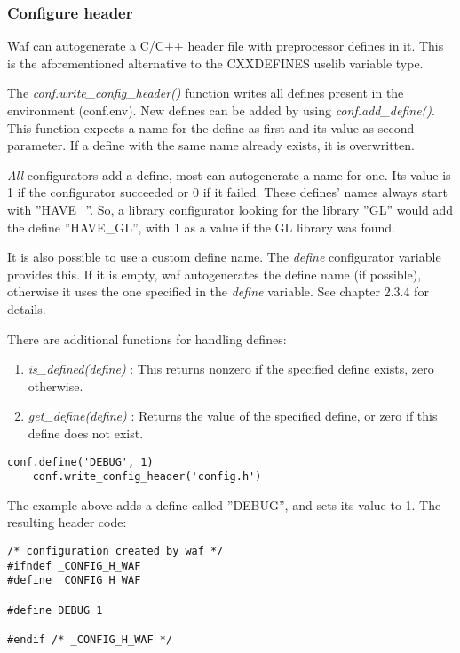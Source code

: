 \documentclass[a4paper,10pt]{article}
\begin{document}
\subsubsection{Configure header}
Waf can autogenerate a C/C++ header file with preprocessor defines in it. This is the aforementioned alternative to the CXXDEFINES uselib variable type.

The \emph{conf.write\_config\_header()} function writes all defines present in the environment (conf.env). New defines can be added by using \emph{conf.add\_define()}. This function expects a name for the define as first and its value as second parameter. If a define with the same name already exists, it is overwritten.

\emph{All} configurators add a define, most can autogenerate a name for one. Its value is 1 if the configurator succeeded or 0 if it failed. These defines' names always start with ''HAVE\_''. So, a library configurator looking for the library ''GL'' would add the define ''HAVE\_GL'', with 1 as a value if the GL library was found.

It is also possible to use a custom define name. The \emph{define} configurator variable provides this. If it is empty, waf autogenerates the define name (if possible), otherwise it uses the one specified in the \emph{define} variable. See chapter 2.3.4 for details.

There are additional functions for handling defines:

\begin{enumerate}
	\item \emph{is\_defined(define)} : This returns nonzero if the specified define exists, zero otherwise.
	\item \emph{get\_define(define)} : Returns the value of the specified define, or zero if this define does not exist.
\end{enumerate}

\begin{center}
	\begin{lstlisting}[caption=\footnotesize Configure header example]
    conf.define('DEBUG', 1)
    conf.write_config_header('config.h')
	\end{lstlisting}
\end{center}

The example above adds a define called ''DEBUG'', and sets its value to 1. The resulting header code:

\begin{center}
	\begin{lstlisting}[caption=\footnotesize Configure header example]
/* configuration created by waf */
#ifndef _CONFIG_H_WAF
#define _CONFIG_H_WAF

#define DEBUG 1

#endif /* _CONFIG_H_WAF */
	\end{lstlisting}
\end{center}
\end{document}
